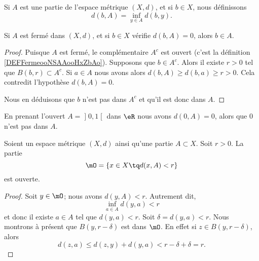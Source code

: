 \begin{definition}      \label{DEFooGNNUooFUZINs}
	Si \( A\) est une partie de l'espace métrique \( (X,d)\), et si \( b\in X\), nous définissons
	\begin{equation}
		d(b,A)=\inf_{y\in A}d(b,y).
	\end{equation}
\end{definition}

\begin{lemma}        \label{LEMooAIARooQADaxM}
	Si \( A\) est fermé dans \( (X,d)\), et si \( b\in X\) vérifie \( d(b,A)=0\), alors \( b\in A\).
\end{lemma}

\begin{proof}
	Puisque \( A\) est fermé, le complémentaire \( A^c\) est ouvert (c'est la définition \ref{DEFFermeooNSAAooHxZbAo}). Supposons que \( b\in A^c\). Alors il existe \( r>0\) tel que \( B(b,r)\subset A^c\). Si \( a\in A\) nous avons alors \( d(b,A)\geq d(b,a)\geq r>0\). Cela contredit l'hypothèse \( d(b,A)=0\).

	Nous en déduisons que \( b\) n'est pas dans \( A^c\) et qu'il est donc dans \( A\).
\end{proof}


\begin{example}
	En prenant l'ouvert \( A=\mathopen] 0 , 1 \mathclose[\) dans \( \eR\) nous avons \( d(0,A)=0\), alors que \( 0\) n'est pas dans \( A\).
\end{example}

\begin{lemma}    \label{LEMooJNRTooZyKiFC}
	Soient un espace métrique \( (X,d)\) ainsi qu'une partie \( A\subset X\). Soit \( r>0\). La partie
	\begin{equation}
		\mO=\{ x\in X\tq d(x,A) < r\}
	\end{equation}
	est ouverte.
\end{lemma}

\begin{proof}
	Soit \( y\in \mO\); nous avons \( d(y,A)<r\). Autrement dit,
	\begin{equation}
		\inf_{a\in A}d(y,a)<r
	\end{equation}
	et donc il existe \( a\in A\) tel que \( d(y,a)<r\). Soit \( \delta=d(y,a)<r\). Nous montrons à présent que \( B(y,r-\delta)\) est dans \( \mO\). En effet si \( z\in B(y,r-\delta)\), alors
	\begin{equation}
		d(z,a)\leq d(z,y)+d(y,a)<r-\delta+\delta=r.
	\end{equation}
\end{proof}

